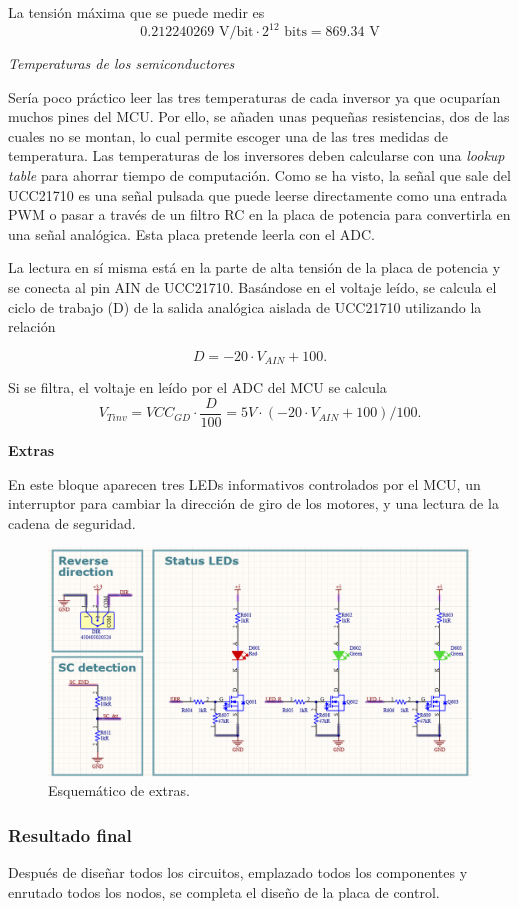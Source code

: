 La tensión máxima que se puede medir es
\[ 0.212240269 \text{ V/bit} \cdot 2^{12} \text{ bits} = 869.34 \text{ V} \]

\textit{Temperaturas de los semiconductores}

Sería poco práctico leer las tres temperaturas de cada inversor ya que ocuparían muchos pines del MCU. Por ello, se añaden unas pequeñas resistencias, dos de las cuales no se montan, lo cual permite escoger una de las tres medidas de temperatura. Las temperaturas de los inversores deben calcularse con una \textit{lookup table} para ahorrar tiempo de computación. Como se ha visto, la señal que sale del UCC21710 es una señal pulsada que puede leerse directamente como una entrada PWM o pasar a través de un filtro RC en la placa de potencia para convertirla en una señal analógica. Esta placa pretende leerla con el ADC.

La lectura en sí misma está en la parte de alta tensión de la placa de potencia y se conecta al pin AIN de UCC21710. Basándose en el voltaje leído, se calcula el ciclo de trabajo (D) de la salida analógica aislada de UCC21710 utilizando la relación

\[ D = -20 \cdot V_{AIN} + 100 .\]

Si se filtra, el voltaje en leído por el ADC del MCU se calcula
\[ V_{Tinv} = VCC_{GD} \cdot \frac{D}{100} = 5V \cdot \left(-20 \cdot V_{AIN} + 100\right)/100 .\]


\textbf{Extras}

En este bloque aparecen tres LEDs informativos controlados por el MCU, un interruptor para cambiar la dirección de giro de los motores, y una lectura de la cadena de seguridad.

\begin{figure}[H]
	\centering
	\includegraphics[width=0.7\linewidth]{fig/schEXTRAScontrol}
	\caption{Esquemático de extras.}
\end{figure}


\subsubsection{Resultado final}
Después de diseñar todos los circuitos, emplazado todos los componentes y enrutado todos los nodos, se completa el diseño de la placa de control.


